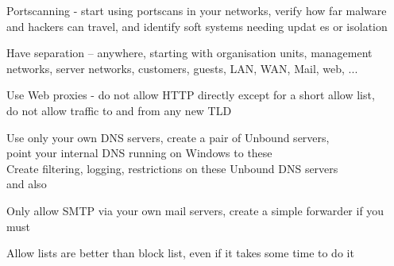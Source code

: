 \documentclass[Screen16to9,17pt]{foils}
\begin{document}
\begin{list2}
\item Portscanning - start using portscans in your networks, verify how far malware and hackers can travel, and identify soft systems needing updat
es or isolation
\item Have separation -- anywhere, starting with organisation units, management networks, server networks, customers, guests, LAN, WAN, Mail, web,
...
\item Use Web proxies - do not allow HTTP directly except for a short allow list, \\
do not allow traffic to and from any new TLD
\item Use only your own DNS servers, create a pair of Unbound servers, \\
point your internal DNS running on Windows to these\\
Create filtering, logging, restrictions on these Unbound DNS servers\\
 and also 
\item Only allow SMTP via your own mail servers, create a simple forwarder if you must
\end{list2}

Allow lists are better than block list, even if it takes some time to do it


\myquestionspage
\end{document}
